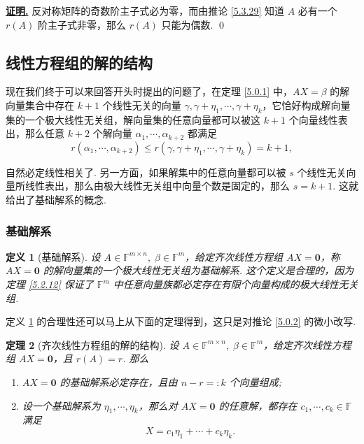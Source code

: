 \documentclass[10pt,openany]{article}
\theoremstyle{thmstyle} %
\newtheorem{theorem}{定理}[subsection]
\theoremstyle{defstyle} %
\newtheorem{definition}[theorem]{定义}
\theoremstyle{prostyle} %
\theoremstyle{exastyle}
\theoremstyle{remstyle}
\renewenvironment{proof}[1][证明]{\par\underline{\textbf{#1.}} \;\fangsong}{\qed\par}
\newcommand{\F}{\mathbb{F}}
\newcommand{\mn}{^{m \times n}}
\begin{document}
\begin{proof}
	反对称矩阵的奇数阶主子式必为零，而由推论 \ref{5.3.29} 知道 \( A \) 必有一个 \( r(A) \) 阶主子式非零，那么 \( r(A) \) 只能为偶数.
\end{proof}



\subsection{线性方程组的解的结构}

现在我们终于可以来回答开头时提出的问题了，在定理 \ref{5.0.1} 中，\( AX=\beta \) 的解向量集合中存在 \( k+1 \) 个线性无关的向量 \( \gamma,\gamma+\eta_1,\cdots,\gamma+\eta_k \)，它恰好构成解向量集的一个极大线性无关组，解向量集的任意向量都可以被这 \( k+1 \) 个向量线性表出，那么任意 \( k+2 \) 个解向量 \( \alpha_1,\cdots,\alpha_{k+2}  \) 都满足
\[ r(\alpha_1,\cdots,\alpha_{k+2}) \leq r(\gamma,\gamma+\eta_1,\cdots,\gamma+\eta_k)=k+1, \]

自然必定线性相关了. 另一方面，如果解集中的任意向量都可以被 \( s \) 个线性无关向量所线性表出，那么由极大线性无关组中向量个数是固定的，那么 \( s=k+1 \). 这就给出了基础解系的概念.

\subsubsection{基础解系}

\begin{definition}[基础解系] \label{5.3.1}
	设 \( A \in \F\mn, \; \beta \in \F^m \)，给定齐次线性方程组 \( AX=\bm{0} \)，称 \( AX=\bm{0} \) 的解向量集的一个极大线性无关组为基础解系. 这个定义是合理的，因为定理 \ref{5.2.12} 保证了 \( \F^m \) 中任意向量族都必定存在有限个向量构成的极大线性无关组.
\end{definition}


定义 \ref{5.3.1} 的合理性还可以马上从下面的定理得到，这只是对推论 \ref{5.0.2} 的微小改写.


\begin{theorem}[齐次线性方程组的解的结构] \label{5.3.2}
	设 \( A \in \F\mn, \; \beta \in \F^m \)，给定齐次线性方程组 \( AX=\bm{0} \)，且 \( r(A)=r \). 那么
	\begin{enumerate}[(1)]
		\item \( AX=\bm{0} \) 的基础解系必定存在，且由 \( n-r=:k \) 个向量组成;
		\item 设一个基础解系为 \( \eta_1,\cdots,\eta_k \)，那么对 \( AX=\bm{0} \) 的任意解，都存在 \( c_1,\cdots,c_k \in \F \) 满足
		\[ X=c_1\eta_1+\cdots+c_k\eta_k. \]
	\end{enumerate}
\end{theorem}
\end{document}
